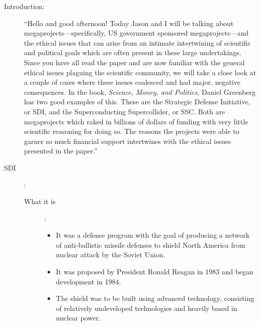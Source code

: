 \documentclass[12pt]{article}
\begin{document}
\thispagestyle{fancy}
\vspace*{0.25in}


\begin{description}

  \item[Introduction:] ``Hello and good afternoon! Today Jason and I will be
    talking about megaprojects---specifically, US government sponsored
    megaprojects---and the ethical issues that can arise from an intimate
    intertwining of scientific and political goals which are often present in
    these large undertakings. Since you have all read the paper and are now
    familiar with the general ethical issues plaguing the scientific community,
    we will take a close look at a couple of cases where these issues coalesced
    and had major, negative consequences. In the book, \emph{Science, Money,
    and Politics}, Daniel Greenberg has two good examples of this. These are
    the Strategic Defense Initiative, or SDI, and the Superconducting
    Supercollider, or SSC. Both are megaprojects which raked in billions of
    dollars of funding with very little scientific reasoning for doing so. The
    reasons the projects were able to garner so much financial support
    intertwines with the ethical issues presented in the paper.''

  \item[SDI]:
    \begin{description}

      \item[What it is]: 
        \begin{itemize}

          \item It was a defense program with the goal of producing a network
            of anti-ballistic missile defenses to shield North America from
            nuclear attack by the Soviet Union.

          \item It was proposed by President Ronald Reagan in 1983 and began
            development in 1984.

          \item The shield was to be built using advanced technology,
            consisting of relatively undeveloped technologies and heavily based
            in nuclear power.


\end{itemize}
\end{description}
\end{description}
\end{document}
